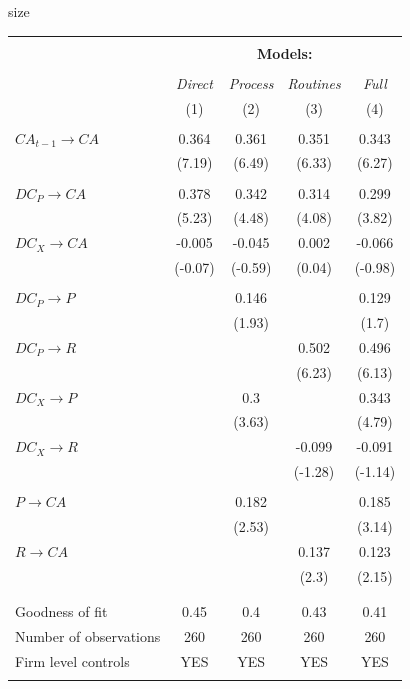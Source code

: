 \documentclass[review,fleqn]{elsarticle}\usepackage[]{graphicx}\usepackage[]{color}
\begin{document}
\begin{table}
\begin{center}
\script size
\begin{tabular}{lcccc}

\hline \\[-2pt]
 & \multicolumn{4}{c}{{\bf Models:}} \\  \cline{2-5} \\[-3pt] 
 & \emph{Direct} & \emph{Process} & \emph{Routines} & \emph{Full}\\
 & (1) & (2) & (3) & (4)\\
\hline
 &  &  &  & \\
\(CA_{t-1} \rightarrow CA\) & 0.364 & 0.361 & 0.351 & 0.343\\
 & (7.19) & (6.49) & (6.33) & (6.27)\\[3pt]
 &  &  &  & \\
\(DC_P \rightarrow CA\) & 0.378 & 0.342 & 0.314 & 0.299\\
 & (5.23) & (4.48) & (4.08) & (3.82)\\[4pt]
\(DC_X \rightarrow CA\) & -0.005 & -0.045 & 0.002 & -0.066\\
 & (-0.07) & (-0.59) & (0.04) & (-0.98)\\[4pt]
 &  &  &  & \\
\(DC_P \rightarrow P\) &  & 0.146 &  & 0.129\\
 &  & (1.93) &  & (1.7)\\[4pt]
\(DC_P \rightarrow R\) &  &  & 0.502 & 0.496\\
 &  &  & (6.23) & (6.13)\\[4pt]
\(DC_X \rightarrow P\) &  & 0.3 &  & 0.343\\
 &  & (3.63) &  & (4.79)\\[4pt]
\(DC_X \rightarrow R\) &  &  & -0.099 & -0.091\\
 &  &  & (-1.28) & (-1.14)\\[4pt]
 &  &  &  & \\
\(P \rightarrow CA\) &  & 0.182 &  & 0.185\\
 &  & (2.53) &  & (3.14)\\[4pt]
\(R \rightarrow CA\) &  &  & 0.137 & 0.123\\
 &  &  & (2.3) & (2.15)\\[4pt]
 &  &  &  & \\
\hline \\[-3pt] 
Goodness of fit & 0.45 & 0.4 & 0.43 & 0.41\\
Number of observations & 260 & 260 & 260 & 260\\
  Firm level controls & YES & YES & YES & YES\\[3pt]
\hline
 &  &  &  & \\
\end{tabular}
\end{center}
 \label{tab:reg}
\end{table}
\end{document}
